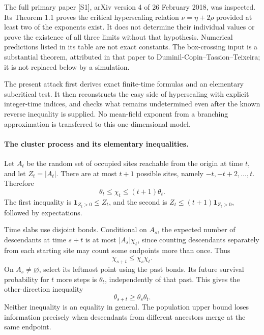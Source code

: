 \documentclass[11pt]{article}
\begin{document}
The full primary paper [S1], arXiv version 4 of 26 February 2018, was
inspected. Its Theorem 1.1 proves the critical hyperscaling relation
$\nu=\eta+2\rho$ provided at least two of the exponents exist. It does
not determine their individual values or prove the existence of all
three limits without that hypothesis. Numerical predictions listed in
its table are not exact constants. The box-crossing input is a substantial
theorem, attributed in that paper to Duminil-Copin--Tassion--Teixeira;
it is not replaced below by a simulation.

The present attack first derives exact finite-time formulas and an
elementary subcritical test. It then reconstructs the easy side of
hyperscaling with explicit integer-time indices, and checks what remains
undetermined even after the known reverse inequality is supplied. No
mean-field exponent from a branching approximation is transferred to this
one-dimensional model.

\paragraph{The cluster process and its elementary inequalities.}
Let $A_t$ be the random set of occupied sites reachable from the origin
at time $t$, and let $Z_t=|A_t|$. There are at most $t+1$ possible sites,
namely $-t,-t+2,\ldots,t$. Therefore
\begin{equation}\label{a457:masssurvival}
 \theta_t\le\chi_t\le(t+1)\theta_t.
\end{equation}
The first inequality is $\mathbf1_{Z_t>0}\le Z_t$, and the second is
$Z_t\le(t+1)\mathbf1_{Z_t>0}$, followed by expectations.

Time slabs use disjoint bonds. Conditional on $A_s$, the expected number
of descendants at time $s+t$ is at most $|A_s|\chi_t$, since counting
descendants separately from each starting site may count some endpoints
more than once. Thus
\begin{equation}\label{a457:submultiplicative}
 \chi_{s+t}\le\chi_s\chi_t.
\end{equation}
On $A_s\ne\varnothing$, select its leftmost point using the past bonds.
Its future survival probability for $t$ more steps is $\theta_t$,
independently of that past. This gives the other-direction inequality
\[
 \theta_{s+t}\ge\theta_s\theta_t.
\]
Neither inequality is an equality in general. The population upper
bound loses information precisely when descendants from different
ancestors merge at the same endpoint.
\end{document}
